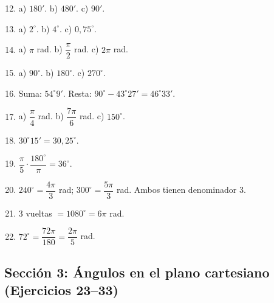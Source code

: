 \documentclass[12pt, letterpaper]{article}
\begin{document}
  \begin{enumerate}[leftmargin=*, label=\textbf{\arabic*.}]
    \setcounter{enumi}{11}
    \item a) $180'$. \quad b) $480'$. \quad c) $90'$.
    \item a) $2^{\circ}$. \quad b) $4^{\circ}$. \quad c) $0{,}75^{\circ}$.
    \item a) $\pi$ rad. \quad b) $\dfrac{\pi}{2}$ rad. \quad c) $2\pi$ rad.
    \item a) $90^{\circ}$. \quad b) $180^{\circ}$. \quad c) $270^{\circ}$.
    \item Suma: $54^{\circ} 9'$. Resta: $90^{\circ} - 43^{\circ} 27' = 46^{\circ} 33'$.
    \item a) $\dfrac{\pi}{4}$ rad. \quad b) $\dfrac{7\pi}{6}$ rad. \quad c) $150^{\circ}$.
    \item $30^{\circ} 15' = 30{,}25^{\circ}$.
    \item $\dfrac{\pi}{5} \cdot \dfrac{180^{\circ}}{\pi} = 36^{\circ}$.
    \item $240^{\circ} = \dfrac{4\pi}{3}$ rad; $300^{\circ} = \dfrac{5\pi}{3}$ rad. Ambos tienen denominador 3.
    \item $3$ vueltas $= 1080^{\circ} = 6\pi$ rad.
    \item $72^{\circ} = \dfrac{72\pi}{180} = \dfrac{2\pi}{5}$ rad. \checkmark
  \end{enumerate}

  \subsection*{Sección 3: Ángulos en el plano cartesiano (Ejercicios 23--33)}
\end{document}
